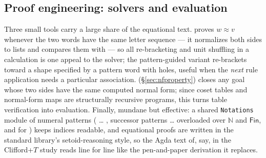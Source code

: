 \subsection{Proof engineering: solvers and evaluation}\label{sec:solvers}

Three small tools carry a large share of the equational text.
 proves $w \approx v$ whenever the two words have the same
letter sequence --- it normalizes both sides to lists and compares them
with  --- so all re-bracketing and unit shuffling in a
calculation is one appeal to the solver; the pattern-guided variant
 re-brackets toward a shape specified by a pattern word
with holes, useful when the \emph{next} rule application needs a
particular association.   (\S\ref{sec:nfproperty})
closes any goal whose two sides have the same computed normal form; since
coset tables and normal-form maps are structurally recursive programs,
this turns table verification into evaluation.  Finally, mundane but
effective: a shared \texttt{Notations} module of numeral patterns
( … , successor patterns  …  overloaded
over $\mathbb{N}$ and $\mathsf{Fin}$, and  for )
keeps indices readable, and equational proofs are written in the standard
library's setoid-reasoning style, so the Agda text of, say,
 in the Clifford+$T$ study reads line for line like the
pen-and-paper derivation it replaces.
